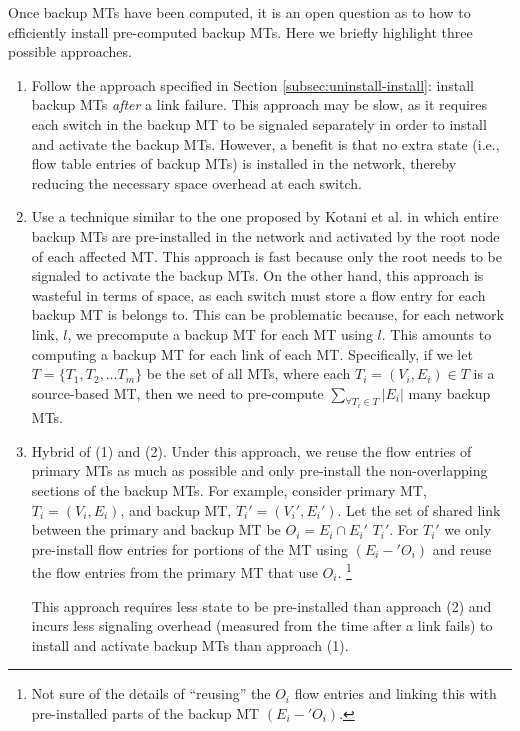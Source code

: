 Once backup MTs have been computed, it is an open question as to how to efficiently install pre-computed backup MTs.  Here we briefly highlight three possible approaches.
\begin{enumerate}
	\item Follow the approach specified in Section \ref{subsec:uninstall-install}: install backup MTs \emph{after} a link failure.  This approach may be slow, as it requires each 
switch in the backup MT to be signaled separately in order to install and activate the backup MTs.  However, a benefit is that no extra state (i.e., flow table entries of backup MTs) is 
installed in the network, thereby reducing the necessary space overhead at each switch.

	\item Use a technique similar to the one proposed by Kotani et al. \cite{Kotani12} in which entire backup MTs are pre-installed in the network and activated by the root node of each 
affected MT.  This approach is fast because only the root needs to be signaled to activate the backup MTs.  On the other hand, this approach is wasteful in terms of space, as each 
switch must store a flow entry for each backup MT is belongs to.  This can be problematic because, for each network link, $l$, we precompute a backup MT for each MT using $l$.  This amounts
to computing a backup MT for each link of each MT.   Specifically, if we let $T = \{T_1,T_2, \dots T_m\}$ be the set of all MTs, 
where each $T_i = (V_i,E_i) \in T$ is a source-based MT,  then we need to pre-compute $\displaystyle \sum_{\forall T_i \in T} {|E_i|}$ many backup MTs. 

	\item Hybrid of (1) and (2).  Under this approach, we reuse the flow entries of primary MTs as much as possible and only pre-install the non-overlapping sections of the backup MTs.  
For example, consider primary MT, $T_i = (V_i,E_i)$, and backup MT, $T_i'=(V_i',E_i')$.  Let the set of shared link between the primary and backup MT be $O_i = E_i \cap E_i'$ $T_i'$. For $T_i'$
we only pre-install flow entries for portions of the MT using $(E_i-'O_i)$ and reuse the flow entries from the primary MT that use $O_i$.  
\footnote{Not sure of the details of ``reusing'' the $O_i$ flow entries and linking this with pre-installed parts of the backup MT  $(E_i-'O_i)$. }

	This approach requires less state to be pre-installed than approach (2) and incurs less signaling overhead (measured from the time after a link fails) to install and activate
backup MTs than approach (1).
\end{enumerate}

